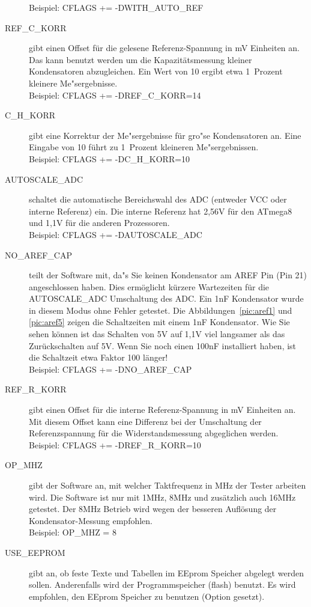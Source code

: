 \begin{description}
Beispiel:  CFLAGS += -DWITH\_AUTO\_REF
  \item[REF\_C\_KORR] gibt einen Offset f\"ur die gelesene Referenz-Spannung in mV Einheiten an.
Das kann benutzt werden um die Kapazit\"atsmessung kleiner Kondensatoren abzugleichen.
Ein Wert von 10 ergibt etwa 1~Prozent kleinere Me"sergebnisse.\\
Beispiel:  CFLAGS += -DREF\_C\_KORR=14
  \item[C\_H\_KORR] gibt eine Korrektur der Me"sergebnisse f\"ur gro"se Kondensatoren an.
Eine Eingabe von 10 f\"uhrt zu 1~Prozent kleineren Me"sergebnissen.\\
Beispiel:  CFLAGS += -DC\_H\_KORR=10
  \item[AUTOSCALE\_ADC] schaltet die automatische Bereichswahl des ADC (entweder VCC oder interne Referenz) ein.
Die interne Referenz hat 2,56V f\"ur den ATmega8 und 1,1V f\"ur die anderen Prozessoren.\\
Beispiel: CFLAGS += -DAUTOSCALE\_ADC
  \item[NO\_AREF\_CAP] teilt der Software mit, da"s Sie keinen Kondensator am AREF Pin (Pin 21) angeschlossen haben.
Dies erm\"oglicht k\"urzere Wartezeiten f\"ur die AUTOSCALE\_ADC Umschaltung des ADC.
Ein 1nF Kondensator wurde in diesem Modus ohne Fehler getestet.
Die Abbildungen~\ref{pic:aref1} und \ref{pic:aref5} zeigen die Schaltzeiten mit einem 1nF Kondensator.
Wie Sie sehen k\"onnen ist das Schalten von 5V auf 1,1V viel langsamer als das Zur\"uckschalten auf 5V.
Wenn Sie noch einen 100nF installiert haben, ist die Schaltzeit etwa Faktor 100 l\"anger!\\
Beispiel: CFLAGS += -DNO\_AREF\_CAP
  \item[REF\_R\_KORR] gibt einen Offset f\"ur die interne Referenz-Spannung in mV Einheiten an.
Mit diesem Offset kann eine Differenz bei der Umschaltung der Referenzspannung f\"ur die Widerstandsmessung abgeglichen werden.\\
Beispiel:  CFLAGS += -DREF\_R\_KORR=10
  \item[OP\_MHZ] gibt der Software an, mit welcher Taktfrequenz in MHz der Tester arbeiten wird.
Die Software ist nur mit 1MHz, 8MHz und zus\"atzlich auch 16MHz getestet. Der 8MHz Betrieb wird wegen der besseren Aufl\"osung der
Kondensator-Messung empfohlen.\\
Beispiel: OP\_MHZ = 8
  \item[USE\_EEPROM] gibt an, ob feste Texte und Tabellen im EEprom Speicher abgelegt werden sollen.
Anderenfalls wird der Programmspeicher (flash) benutzt.
Es wird empfohlen, den EEprom Speicher zu benutzen (Option gesetzt).\\

\end{description}
